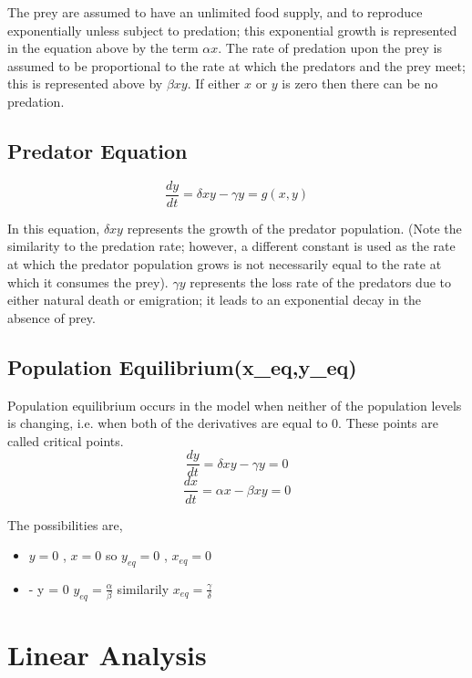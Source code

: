 \documentclass{article}
\begin{document}
The prey are assumed to have an unlimited food supply, and to reproduce exponentially unless subject to predation;
this exponential growth is represented in the equation above by the term $ \alpha x . $ The rate of predation upon the prey is
assumed to be proportional to the rate at which the predators and the prey meet; this is represented above by $ \beta x y $. If
either $ x $ or $ y $ is zero then there can be no predation.

\subsection*{Predator Equation}
\begin{equation*}
    \frac { d y } { d t } = \delta x y - \gamma y = g(x,y)
\end{equation*}

In this equation, $ \delta x y $ represents the growth of the predator population. (Note the similarity to the predation rate;
however, a different constant is used as the rate at which the predator population grows is not necessarily equal to the
rate at which it consumes the prey). $ \gamma y $ represents the loss rate of the predators due to either natural death or
emigration; it leads to an exponential decay in the absence of prey.

\subsection*{Population Equilibrium(x_{eq},y_{eq})}
Population equilibrium occurs in the model when neither of the population levels is changing, i.e. when both of the
derivatives are equal to $ 0 . $ These points are called critical points.
\begin{equation*}
    \frac { d y } { d t } = \delta x y - \gamma y = 0
\end{equation*}
\begin{equation*}
     \frac { d x } { d t } = \alpha x - \beta x y = 0
\end{equation*}

The possibilities are, 
\begin{itemize}
    \item $ y = 0 $ , $ x = 0 $ so $ y_{eq} = 0 $ , $ x_{eq} = 0 $
    \item \alpha - \beta y = 0 \Longrightarrow $y_{eq} = \frac{\alpha}{\beta}$ similarily $x_{eq} = \frac{\gamma}{\delta}$
\end{itemize}
\section*{Linear Analysis}
\end{document}
